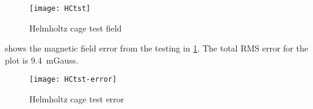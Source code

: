 \begin{figure}[htb]
    \centering
    \texttt{[image: HCtst]}
    \caption{Helmholtz cage test field}
    \label{fig:hc-tst}
\end{figure}

 shows the magnetic field error from the testing in \cref{fig:hc-tst}. The total RMS error for the plot is 9.4~mGauss. 

\begin{figure}[htb]
    \centering
    \texttt{[image: HCtst-error]}
    \caption{Helmholtz cage test error}
    \label{fig:hc-tst-err}
\end{figure}

